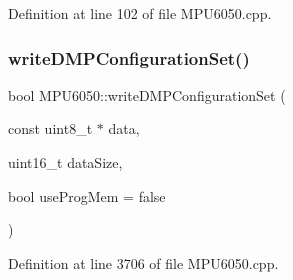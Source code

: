 Definition at line 102 of file M\+P\+U6050.\+cpp.


\begin{DoxyCode}{0}

\end{DoxyCode}
\mbox{\label{classMPU6050_abe4f64f68164116b2ec94fe1d987929a}} 
\subsubsection{\texorpdfstring{writeDMPConfigurationSet()}{writeDMPConfigurationSet()}}
{\footnotesize\ttfamily bool M\+P\+U6050\+::write\+D\+M\+P\+Configuration\+Set (\begin{DoxyParamCaption}\item[{const uint8\+\_\+t $\ast$}]{data,  }\item[{uint16\+\_\+t}]{data\+Size,  }\item[{bool}]{use\+Prog\+Mem = {\ttfamily false} }\end{DoxyParamCaption})}



Definition at line 3706 of file M\+P\+U6050.\+cpp.


